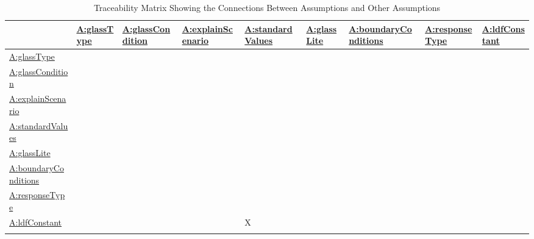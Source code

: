 \documentclass[12pt]{article}
\begin{document}
\begin{longtable}{l l l l l l l l l}
\toprule
\textbf{} & \textbf{\hyperref[assumpGT]{A:glassType}} & \textbf{\hyperref[assumpGC]{A:glassCondition}} & \textbf{\hyperref[assumpES]{A:explainScenario}} & \textbf{\hyperref[assumpSV]{A:standardValues}} & \textbf{\hyperref[assumpGL]{A:glassLite}} & \textbf{\hyperref[assumpBC]{A:boundaryConditions}} & \textbf{\hyperref[assumpRT]{A:responseType}} & \textbf{\hyperref[assumpLDFC]{A:ldfConstant}}
\\
\midrule
\endhead
\hyperref[assumpGT]{A:glassType} &  &  &  &  &  &  &  & 
\\
\hyperref[assumpGC]{A:glassCondition} &  &  &  &  &  &  &  & 
\\
\hyperref[assumpES]{A:explainScenario} &  &  &  &  &  &  &  & 
\\
\hyperref[assumpSV]{A:standardValues} &  &  &  &  &  &  &  & 
\\
\hyperref[assumpGL]{A:glassLite} &  &  &  &  &  &  &  & 
\\
\hyperref[assumpBC]{A:boundaryConditions} &  &  &  &  &  &  &  & 
\\
\hyperref[assumpRT]{A:responseType} &  &  &  &  &  &  &  & 
\\
\hyperref[assumpLDFC]{A:ldfConstant} &  &  &  & X &  &  &  & 
\\
\bottomrule
\caption{Traceability Matrix Showing the Connections Between Assumptions and Other Assumptions}
\label{Table:TraceMatAvsA}
\end{longtable}
\end{document}
